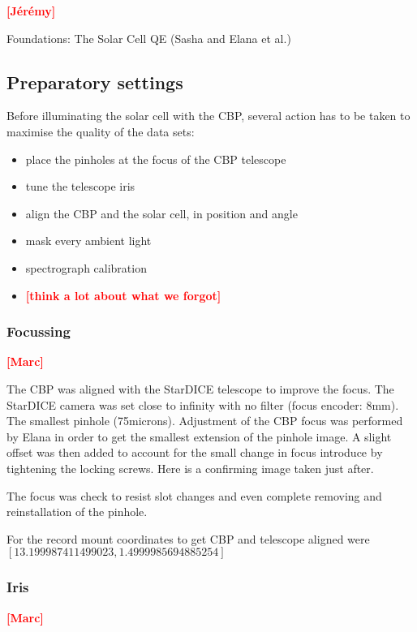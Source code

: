 \documentclass[printer]{aa}
\newcommand{\todo}[1]{\textbf{\textcolor{red}{[#1]}}\xspace}
\begin{document}
\todo{Jérémy}

Foundations: The Solar Cell QE (Sasha and Elana et al.)



\subsection{Preparatory settings}

Before illuminating the solar cell with the CBP, several action has to be taken to maximise the quality of the data sets:
\begin{itemize}
\item place the pinholes at the focus of the CBP telescope
\item tune the telescope iris
\item align the CBP and the solar cell, in position and angle
\item mask every ambient light
\item spectrograph calibration
\item \todo{think a lot about what we forgot}
\end{itemize}



\subsubsection{Focussing}

\todo{Marc}


The CBP was aligned with the StarDICE telescope to improve the focus. The
StarDICE camera was set close to infinity with no filter (focus encoder:
8mm). The smallest pinhole (75microns). Adjustment of the CBP focus was
performed by Elana in order to get the smallest extension of the pinhole
image. A slight offset was then added to account for the small change in focus
introduce by tightening the locking screws. Here is a confirming image taken
just after.

The focus was check to resist slot changes and even complete removing and
reinstallation of the pinhole.

For the record mount coordinates to get CBP and telescope aligned were
$[13.199987411499023, 1.4999985694885254]$


\subsubsection{Iris}

\todo{Marc}
\end{document}
